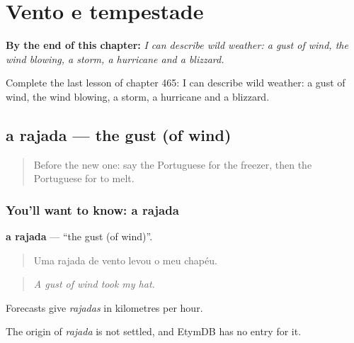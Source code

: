 
\chapter{Vento e tempestade}
\label{ch:pt-vento-e-tempestade}

\begin{chapteropening}
\textbf{By the end of this chapter:} \emph{I can describe wild weather: a gust of wind, the wind blowing, a storm, a hurricane and a blizzard.}

Complete the last lesson of chapter 465: I can describe wild weather: a gust of wind, the wind blowing, a storm, a hurricane and a blizzard.
\end{chapteropening}

\section[a rajada]{a rajada — the gust (of wind)}

\label{lesson:PT-C465-rajada}



\begin{quote}
Before the new one: say the Portuguese for the freezer, then the Portuguese for to melt.
\end{quote}

\subsection*{You'll want to know: a rajada}
\textbf{a rajada} — \textquotedblleft{}the gust (of wind)\textquotedblright{}.

\begin{quote}
Uma rajada de vento levou o meu chapéu.
\end{quote}

\begin{quote}
\emph{A gust of wind took my hat.}
\end{quote}

Forecasts give \emph{rajadas} in kilometres per hour.

\begin{cousinweb}
The origin of \emph{rajada} is not settled, and EtymDB has no entry for it.
\end{cousinweb}

